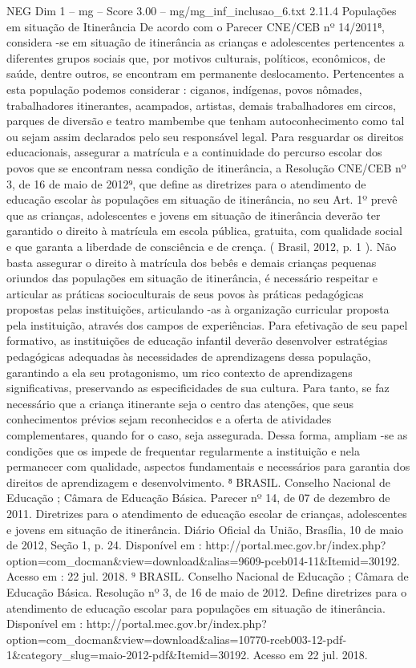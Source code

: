 \begin{textsample}{NEG Dim 1 – mg – Score 3.00 – mg/mg\_inf\_inclusao\_6.txt}  \label{ex:f1_neg_055}
2.11.4 Populações em situação de Itinerância De acordo com o Parecer CNE/CEB nº 14/2011⁸, considera -se em situação de itinerância as crianças e adolescentes pertencentes a diferentes grupos sociais que, por motivos culturais, políticos, econômicos, de saúde, dentre outros, se encontram em permanente deslocamento.
Pertencentes a esta população podemos considerar : ciganos, indígenas, povos nômades, trabalhadores itinerantes, acampados, artistas, demais trabalhadores em circos, parques de diversão e teatro mambembe que tenham autoconhecimento como tal ou sejam assim declarados pelo seu responsável legal.
Para resguardar os direitos educacionais, assegurar a matrícula e a continuidade do percurso escolar dos povos que se encontram nessa condição de itinerância, a Resolução CNE/CEB nº 3, de 16 de maio de 2012⁹, que define as diretrizes para o atendimento de educação escolar às populações em situação de itinerância, no seu Art. 1º prevê que as crianças, adolescentes e jovens em situação de itinerância deverão ter garantido o direito à matrícula em escola pública, gratuita, com qualidade social e que garanta a liberdade de consciência e de crença. ( Brasil, 2012, p. 1 ).
Não basta assegurar o direito à matrícula dos bebês e demais crianças pequenas oriundos das populações em situação de itinerância, é necessário respeitar e articular as práticas socioculturais de seus povos às práticas pedagógicas propostas pelas instituições, articulando -as à organização curricular proposta pela instituição, através dos campos de experiências.
Para efetivação de seu papel formativo, as instituições de educação infantil deverão desenvolver estratégias pedagógicas adequadas às necessidades de aprendizagens dessa população, garantindo a ela seu protagonismo, um rico contexto de aprendizagens significativas, preservando as especificidades de sua cultura.
Para tanto, se faz necessário que a criança itinerante seja o centro das atenções, que seus conhecimentos prévios sejam reconhecidos e a oferta de atividades complementares, quando for o caso, seja assegurada.
Dessa forma, ampliam -se as condições que os impede de frequentar regularmente a instituição e nela permanecer com qualidade, aspectos fundamentais e necessários para garantia dos direitos de aprendizagem e desenvolvimento. ⁸ BRASIL.
Conselho Nacional de Educação ; Câmara de Educação Básica.
Parecer nº 14, de 07 de dezembro de 2011.
Diretrizes para o atendimento de educação escolar de crianças, adolescentes e jovens em situação de itinerância.
Diário Oficial da União, Brasília, 10 de maio de 2012, Seção 1, p. 24.
Disponível em : http://portal.mec.gov.br/index.php? option=com\_docman\&view=download\&alias=9609-pceb014-11\&Itemid=30192.
Acesso em : 22 jul. 2018. ⁹ BRASIL.
Conselho Nacional de Educação ; Câmara de Educação Básica.
Resolução nº 3, de 16 de maio de 2012.
Define diretrizes para o atendimento de educação escolar para populações em situação de itinerância.
Disponível em : http://portal.mec.gov.br/index.php? option=com\_docman\&view=download\&alias=10770-rceb003-12-pdf-1\&category\_slug=maio-2012-pdf\&Itemid=30192.
Acesso em 22 jul. 2018.

\end{textsample}
